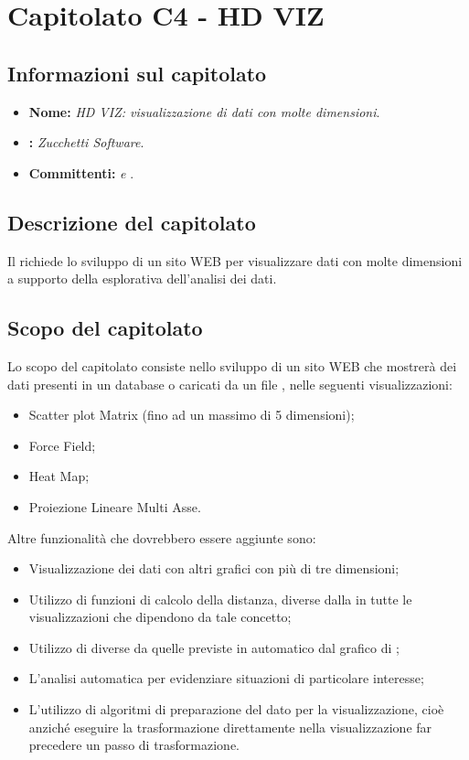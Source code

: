 \section{Capitolato C4 - HD VIZ}\label{C4}
\subsection{Informazioni sul capitolato}
\begin{itemize}
	\item \textbf{Nome:} \textit{HD VIZ: visualizzazione di dati con molte dimensioni}.
	\item \textbf{:} \textit{Zucchetti Software}.
	\item \textbf{Committenti:} \textit{\VT{} e \CR{}}.
\end{itemize}

\subsection{Descrizione del capitolato}
Il  richiede lo sviluppo di un sito WEB per visualizzare dati con molte dimensioni a supporto della  esplorativa dell'analisi dei dati.

\subsection{Scopo del capitolato}
Lo scopo del capitolato consiste nello sviluppo di un sito WEB che mostrerà dei dati presenti in un database o caricati da un file , nelle seguenti visualizzazioni:
\begin{itemize}
	\item Scatter plot Matrix (fino ad un massimo di 5 dimensioni);
	\item Force Field;
	\item Heat Map;
	\item Proiezione Lineare Multi Asse.
\end{itemize}
Altre funzionalità che dovrebbero essere aggiunte sono:
\begin{itemize}
	\item Visualizzazione dei dati con altri grafici con più di tre dimensioni;
	\item Utilizzo di funzioni di calcolo della distanza, diverse dalla  in tutte le visualizzazioni che dipendono da tale concetto;
	\item Utilizzo di  diverse da quelle previste in automatico dal grafico  di \textit{};
	\item L'analisi automatica per evidenziare situazioni di particolare interesse;
	\item L'utilizzo di algoritmi di preparazione del dato per la visualizzazione, cioè anziché eseguire la trasformazione direttamente nella visualizzazione far precedere un passo di trasformazione.
\end{itemize}

